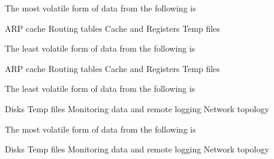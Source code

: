 \documentclass[theme=sleek, randomorder, hidesidemenu]{webquiz}
\begin{document}
\begin{question}
  The most volatile form of data from the following is
  \begin{choice}[columns=2]
    \incorrect ARP cache
    \incorrect Routing tables
    \correct Cache and Registers
    \incorrect Temp files
  \end{choice}
\end{question}

\begin{question}
  The least volatile form of data from the following is
  \begin{choice}[columns=2]
    \incorrect ARP cache
    \incorrect Routing tables
    \incorrect Cache and Registers
    \correct Temp files
  \end{choice}
\end{question}

\begin{question}
  The least volatile form of data from the following is
  \begin{choice}[columns=2]
    \incorrect Disks
    \incorrect Temp files
    \incorrect Monitoring data and remote logging
    \correct Network topology
  \end{choice}
\end{question}

\begin{question}
  The most volatile form of data from the following is
  \begin{choice}[columns=2]
    \incorrect Disks
    \correct Temp files
    \incorrect Monitoring data and remote logging
    \incorrect Network topology
  \end{choice}
\end{question}
\end{document}
